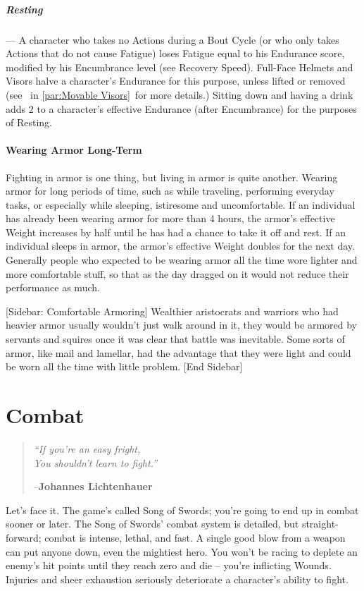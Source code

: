 \documentclass[oneside,11pt,english]{book}
\begin{document}
\paragraph{Resting}---\quad
A character who takes no Actions during a Bout Cycle (or who only takes Actions that do not cause 
Fatigue) loses Fatigue equal to his Endurance score, modified by his Encumbrance level (see Recovery 
Speed). Full-Face Helmets and Visors halve a character’s Endurance for this purpose, unless lifted or
removed (see ~in \autoref{par:Movable Visors}~for more details.)
Sitting down and having a drink adds 2 to a character’s effective Endurance (after Encumbrance) for the 
purposes of Resting. 


\subsubsection{Wearing Armor Long-Term}
Fighting in armor is one thing, but living in armor is quite another. Wearing armor for long periods of 
time, such as while traveling, performing everyday tasks, or especially while sleeping, istiresome and 
uncomfortable. 
If an individual has already been wearing armor for more than 4 hours, the armor’s effective Weight 
increases by half until he has had a chance to take it off and rest. 
If an individual sleeps in armor, the armor’s effective Weight doubles for the next day. 
Generally people who expected to be wearing armor all the time wore lighter and more comfortable stuff, 
so that as the day dragged on it would not reduce their performance as much. 


[Sidebar: Comfortable Armoring] 
Wealthier aristocrats and warriors who had heavier armor usually wouldn’t just walk around in it, they 
would be armored by servants and squires once it was clear that battle was inevitable. Some sorts of 
armor, like mail and lamellar, had the advantage that they were light and could be worn all the time with 
little problem. 
[End Sidebar] 


\chapter{Combat}\label{ch:combat}
\startcontents[chapters]
\clearpage
\begin{quote}
	\centering
		\emph{“If you’re an easy fright,\\
			You shouldn’t learn to fight.”}\par
		\hfill--\textbf{Johannes Lichtenhauer}
\end{quote}
Let’s face it. The game’s called Song of Swords; you’re going to end up in combat sooner or later. The Song of Swords’ combat system is detailed, but straight-forward; combat is intense, lethal, and fast. A
single good blow from a weapon can put anyone down, even the mightiest hero. You won’t be racing to
deplete an enemy’s hit points until they reach zero and die -- you’re inflicting Wounds. Injuries and sheer
exhaustion seriously deteriorate a character’s ability to fight.
\end{document}
